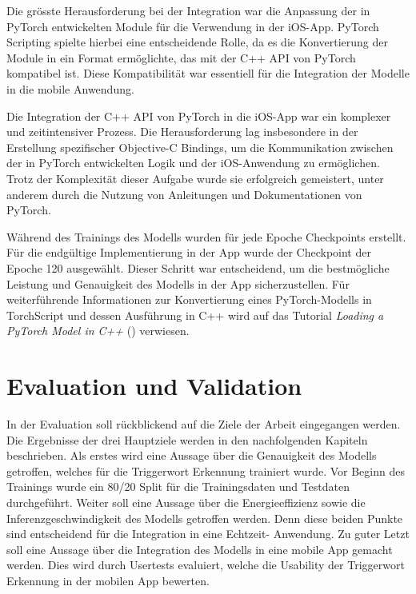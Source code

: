 \documentclass[11pt,a4paper]{article}
\begin{document}
\noindent \newline
Die grösste Herausforderung bei der Integration war die Anpassung der in PyTorch entwickelten Module 
für die Verwendung in der iOS-App. PyTorch Scripting spielte hierbei eine entscheidende Rolle, da 
es die Konvertierung der Module in ein Format ermöglichte, das mit der C++ API von PyTorch 
kompatibel ist. Diese Kompatibilität war essentiell für die Integration der Modelle in die mobile 
Anwendung.

\noindent \newline
Die Integration der C++ API von PyTorch in die iOS-App war ein komplexer und zeitintensiver Prozess. 
Die Herausforderung lag insbesondere in der Erstellung spezifischer Objective-C Bindings, um die 
Kommunikation zwischen der in PyTorch entwickelten Logik und der iOS-Anwendung zu ermöglichen. 
Trotz der Komplexität dieser Aufgabe wurde sie erfolgreich gemeistert, unter anderem durch die 
Nutzung von Anleitungen und Dokumentationen von PyTorch.

\noindent \newline
Während des Trainings des Modells wurden für jede Epoche Checkpoints erstellt. Für die endgültige 
Implementierung in der App wurde der Checkpoint der Epoche 120 ausgewählt. Dieser Schritt war 
entscheidend, um die bestmögliche Leistung und Genauigkeit des Modells in der App sicherzustellen. 
Für weiterführende Informationen zur Konvertierung eines PyTorch-Modells in TorchScript und dessen 
Ausführung in C++ wird auf das Tutorial \textit{Loading a PyTorch Model in C++} 
(\cite{pytorch2023jit}) verwiesen.


\newpage \section{Evaluation und Validation} \label{sec:evaluation}
In der Evaluation soll rückblickend auf die Ziele der Arbeit eingegangen werden. Die Ergebnisse der 
drei Hauptziele werden in den nachfolgenden Kapiteln beschrieben. Als erstes wird eine Aussage über 
die Genauigkeit des Modells getroffen, welches für die Triggerwort Erkennung trainiert wurde. Vor 
Beginn des Trainings wurde ein 80/20 Split für die Trainingsdaten und Testdaten durchgeführt. 
Weiter soll eine Aussage über die Energieeffizienz sowie die Inferenzgeschwindigkeit des Modells 
getroffen werden. Denn diese beiden Punkte sind entscheidend für die Integration in eine Echtzeit-
Anwendung. Zu guter Letzt soll eine Aussage über die Integration des Modells in eine mobile App 
gemacht werden. Dies wird durch Usertests evaluiert, welche die Usability der Triggerwort Erkennung in der 
mobilen App bewerten.
\end{document}
